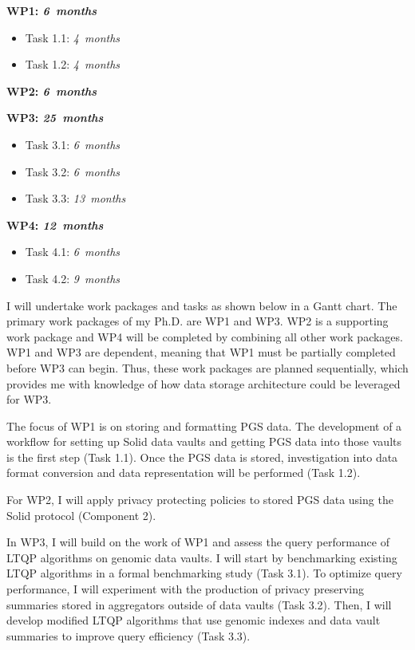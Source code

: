 \documentclass[a4paper,11pt]{article}
\begin{document}
\begin{refsection}
\begin{adjustwidth}{0cm}{0cm}
	\parindent 0pt
	\newcommand\duration[1]{\hfill\emph{#1~months}}
  
	\textbf{WP1:      \WPa  \duration{6}}
	\begin{itemize}
	  \item Task 1.1: \WPaa \duration{ 4}
	  \item Task 1.2: \WPab \duration{ 4}
	\end{itemize}
	\smallskip
  
	\textbf{WP2:      \WPb  \duration{6}}
	\smallskip
	
	\textbf{WP3:      \WPc  \duration{25}}
	\begin{itemize}
	  \item Task 3.1: \WPca \duration{ 6}
	  \item Task 3.2: \WPcb \duration{ 6}
	  \item Task 3.3: \WPcc \duration{ 13}
	\end{itemize}
	\smallskip
	
	\textbf{WP4:      \WPd  \duration{ 12}}
  \begin{itemize}
	  \item Task 4.1: \WPda \duration{ 6}
	  \item Task 4.2: \WPdb \duration{ 9}
	\end{itemize}
\end{adjustwidth}

\noindent
I will undertake work packages and tasks as shown below in a Gantt chart.
The primary work packages of my Ph.D. are WP1 and WP3.
WP2 is a supporting work package and WP4 will be completed by combining all other work packages.
WP1 and WP3 are dependent, meaning that WP1 must be partially completed before WP3 can begin.
Thus, these work packages are planned sequentially, which provides me with knowledge of how data storage architecture could be leveraged for WP3.

The focus of WP1 is on storing and formatting PGS data.
The development of a workflow for setting up Solid data vaults and getting PGS data into those vaults is the first step (Task 1.1).
Once the PGS data is stored, investigation into data format conversion and data representation will be performed (Task 1.2).

For WP2, I will apply privacy protecting policies to stored PGS data using the Solid protocol (Component 2).

In WP3, I will build on the work of WP1 and assess the query performance of LTQP algorithms on genomic data vaults.
I will start by benchmarking existing LTQP algorithms in a formal benchmarking study (Task 3.1).
To optimize query performance, I will experiment with the production of privacy preserving summaries stored in aggregators outside of data vaults (Task 3.2).
Then, I will develop modified LTQP algorithms that use genomic indexes and data vault summaries to improve query efficiency (Task 3.3).


\end{refsection}
\end{document}
